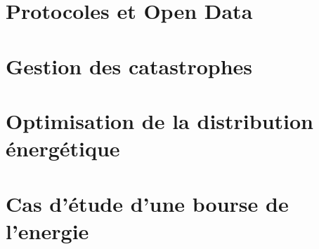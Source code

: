\section{Protocoles et Open Data}
\lipsum
\section{Gestion des catastrophes}
\lipsum
\section{Optimisation de la distribution énergétique}
\lipsum
\section{Cas d'étude d'une bourse de l'energie}
\lipsum
